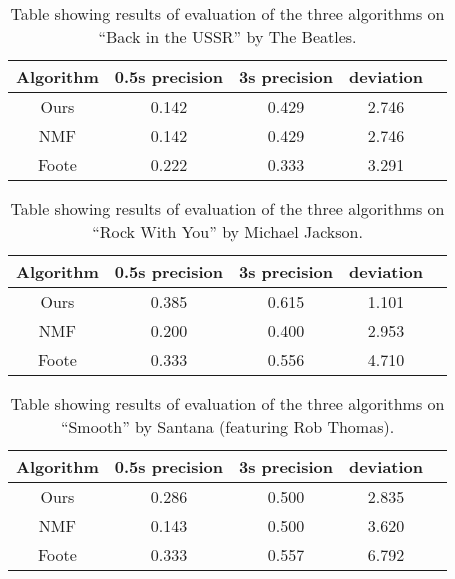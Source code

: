 \begin{table}
\begin{center}
\begin{tabular}{| c | c | c | c | c |} \hline 
Algorithm  &   0.5s precision   	&  3s precision 	&   deviation   	\\ \hline \hline
Ours			& 	0.142				&  0.429				& 	2.746		\\ \hline
NMF			&  0.142				&  0.429				&	2.746		\\ \hline
Foote		&  0.222				&  0.333				& 	3.291		\\ \hline
\end{tabular}
\caption{Table showing results of evaluation of the three algorithms on ``Back in the USSR'' by The Beatles.}
\label{table:evalUSSR}
\end{center}
\end{table}

\begin{table}
\begin{center}
\begin{tabular}{| c | c | c | c | c |} \hline 
Algorithm  &   0.5s precision   	&  3s precision 	&   deviation   	\\ \hline \hline
Ours			& 	0.385				&  0.615				& 	1.101		\\ \hline
NMF			&  0.200				&  0.400				&	2.953		\\ \hline
Foote		&  0.333				&  0.556				& 	4.710		\\ \hline
\end{tabular}
\caption{Table showing results of evaluation of the three algorithms on ``Rock With You'' by Michael Jackson.}
\label{table:evalRockwithyou}
\end{center}
\end{table}


\begin{table}
\begin{center}
\begin{tabular}{| c | c | c | c | c |} \hline 
Algorithm  &   0.5s precision   	&  3s precision 	&   deviation   	\\ \hline \hline
Ours			& 	0.286				&  0.500				& 	2.835		\\ \hline
NMF			&  0.143				&  0.500				&	3.620		\\ \hline
Foote		&  0.333				&  0.557				& 	6.792		\\ \hline
\end{tabular}
\caption{Table showing results of evaluation of the three algorithms on ``Smooth'' by Santana (featuring Rob Thomas).}
\label{table:evalSmooth}
\end{center}
\end{table}


